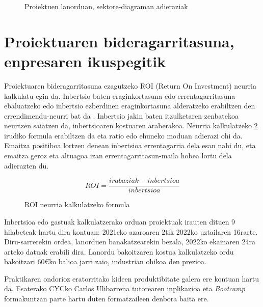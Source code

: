 \begin{figure}[H]
\vspace{1cm}
\centering
{}
\caption{Proiektuen lanorduan, sektore-diagraman adieraziak}
\label{lanen-piechart}
\end{figure}


\section{Proiektuaren bideragarritasuna, enpresaren ikuspegitik}\label{sec:roi}
Proiektuaren bideragarritasuna ezagutzeko ROI (Return On Investment) neurria kalkulatu egin da. Inbertsio baten eraginkortasuna edo errentagarritasuna ebaluatzeko edo inbertsio ezberdinen eraginkortasuna alderatzeko erabiltzen den errendimendu-neurri bat da \cite{roi}. Inbertsio jakin baten itzulketaren zenbatekoa neurtzen saiatzen da, inbertsioaren kostuaren araberakoa. Neurria kalkulatzeko \ref{roi} irudiko formula erabiltzen da eta ratio edo ehuneko moduan adierazi ohi da. Emaitza positiboa lortzen denean inbertsioa errentagarria dela esan nahi du, eta emaitza geroz eta altuagoa izan errentagarritasun-maila hobea lortu dela adierazten du.

\begin{figure}[H]
\centering
\begin{displaymath}
ROI = \frac{irabaziak - inbertsioa}{inbertsioa}
\end{displaymath}
\caption{ROI neurria kalkulatzeko formula}
\label{roi}
\end{figure}

Inbertsioa edo gastuak kalkulatzerako orduan proiektuak irauten dituen 9 hilabeteak hartu dira kontuan: 2021eko azaroaren 2tik 2022ko uztailaren 16rarte. Diru-sarrerekin ordea, lanorduen banakatzearekin bezala, 2022ko ekainaren 24ra arteko datuak erabili dira. Lanordu bakoitzaren kostua kalkulatzeko ordu bakoitzari 60€ko balioa jarri zaio, industrian ohikoa den prezioa. 

Praktikaren ondorioz eratorritako kideen produktibitate galera ere kontuan hartu da. Esaterako CYCko Carlos Ulibarrena tutorearen inplikazioa eta \textit{Bootcamp} formakuntzan parte hartu duten formatzaileen denbora baita ere. 

